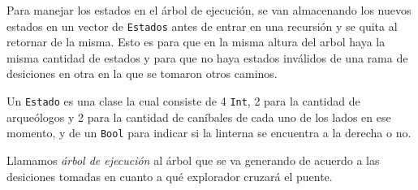             Para manejar los estados en el árbol de ejecución, se van almacenando los nuevos estados en un vector de \texttt{Estados} antes de entrar en una recursión y se quita al retornar de la misma. Esto es para que en la misma altura del arbol haya la misma cantidad de estados y para que no haya estados inválidos de una rama de desiciones en otra en la que se tomaron otros caminos.

            Un \texttt{Estado} es una clase la cual consiste de 4 \texttt{Int}, 2 para la cantidad de arqueólogos y 2 para la cantidad de caníbales de cada uno de los lados en ese momento, y de un \texttt{Bool} para indicar si la linterna se encuentra a la derecha o no.

            Llamamos \emph{árbol de ejecución} al árbol que se va generando de acuerdo a las desiciones tomadas en cuanto a qué explorador cruzará el puente.

